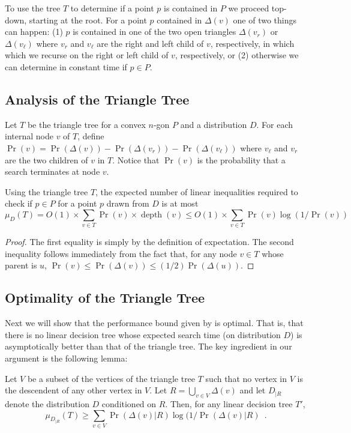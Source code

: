 \documentclass[charterfonts,lotsofwhite]{patmorin}
\DeclareMathOperator{\depth}{depth}
\begin{document}
To use the tree $T$ to determine if a point $p$ is contained in $P$ we
proceed top-down, starting at the root.  For a point $p$ contained in
$\Delta(v)$ one of two things can happen: (1) $p$ is contained in one
of the two open triangles $\Delta(v_r)$ or $\Delta(v_\ell)$ where
$v_r$ and $v_\ell$ are the right and left child of $v$, respectively,
in which which we recurse on the right or left child of $v$,
respectively, or (2) otherwise we can determine in constant time if
$p\in P$.

\subsection{Analysis of the Triangle Tree}

Let $T$ be the triangle tree for a convex $n$-gon $P$ and a
distribution $D$.  For each internal node $v$ of $T$, define
$\Pr(v)=\Pr(\Delta(v))-\Pr(\Delta(v_r))-\Pr(\Delta(v_\ell))$ where
$v_\ell$ and $v_r$ are the two children of $v$ in $T$.  Notice that
$\Pr(v)$ is the probability that a search terminates at node $v$.

\begin{thm}
Using the triangle tree $T$, the expected number of linear inequalities
required to check if $p\in P$ for a point $p$ drawn from $D$ is at
most
\[
     \mu_D(T) = O(1)\times \sum_{v\in T}\Pr(v)\times\depth (v)
      \le O(1)\times \sum_{v\in T}\Pr(v)\log(1/\Pr(v))
\]
\end{thm}

\begin{proof}
The first equality is simply by the definition of expectation.  The
second inequality follows immediately from the fact that, for any node
$v\in T$ whose parent is $u$, $\Pr(v)\le \Pr(\Delta(v))\le (1/2)\Pr(\Delta(u))$.
\end{proof}


\subsection{Optimality of the Triangle Tree}

Next we will show that the performance bound given by
 is optimal.  That is, that there is no linear
decision tree whose expected search time (on distribution $D$) is
asymptotically better than that of the triangle tree.
The key ingredient in our argument is the following lemma:

\begin{lem}
Let $V$ be a subset of the vertices of the triangle tree $T$ such that
no vertex in $V$ is the descendent of any other vertex in $V$.  Let
$R=\bigcup_{v\in V} \Delta(v)$ and let $D_{|R}$ denote the
distribution $D$ conditioned on $R$.  Then, for any linear decision
tree $T'$,
\[
    \mu_{D_{|R}}(T) 
	\ge \sum_{v\in V}\Pr(\Delta(v)|R)\log(1/\Pr(\Delta(v)|R) \enspace .
\]
\end{lem}
\end{document}
